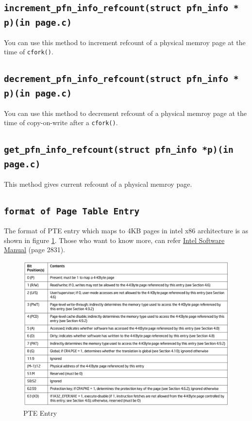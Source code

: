 \documentclass[12pt]{article}
\begin{document}
\subsection*{\tt increment\_pfn\_info\_refcount(struct pfn\_info * p)(in page.c)}
 You can use this method to increment refcount of a physical memroy page at the time of {\tt cfork()}.
\subsection*{\tt decrement\_pfn\_info\_refcount(struct pfn\_info * p)(in page.c)}
 You can use this method to decrement refcount of a physical memroy page at the time of copy-on-write after a {\tt cfork()}.
 
\subsection*{\tt get\_pfn\_info\_refcount(struct pfn\_info *p)(in page.c)}
This method gives current refcount of a physical memroy page.

\subsection*{\tt format of Page Table Entry}
The format of PTE entry which maps to 4KB pages in intel x86 architecture is as shown in figure \ref{fig:pte}. Those who want to know more, can refer \href{https://software.intel.com/sites/default/files/managed/39/c5/325462-sdm-vol-1-2abcd-3abcd.pdf}{Intel Software Manual} (page 2831).
\begin{figure}[H]
    \centering
    \includegraphics[scale=.25]{PTE_Entry.png}
    \caption{PTE Entry}
    \label{fig:pte}
\end{figure}
\end{document}
